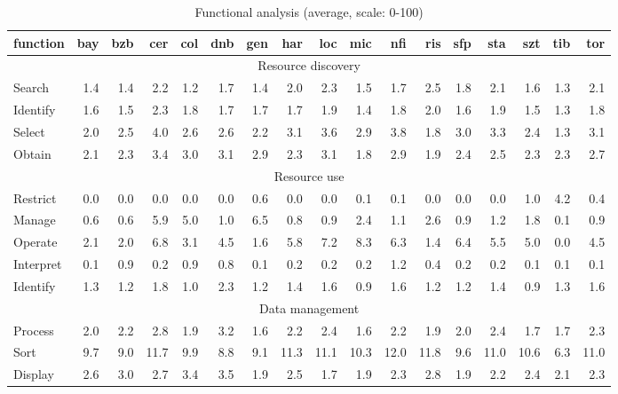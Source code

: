 \begin{table*}
\caption{Functional analysis (average, scale: 0-100)}
\label{tab:functional-analysis}
\begin{minipage}{17.5cm} %
\begin{center}
\begin{tabular}{lrrrrrrrrrrrrrrrr}
\toprule
function & bay & bzb & cer & col & dnb & gen & har & loc & mic & nfi & ris & sfp & sta & szt & tib & tor \\
\midrule
\multicolumn{17}{c}{Resource discovery} \\
Search & 1.4 & 1.4 & 2.2 & 1.2 & 1.7 & 1.4 & 2.0 & 2.3 & 1.5 & 1.7 & 2.5 & 1.8 & 2.1 & 1.6 & 1.3 & 2.1 \\
Identify & 1.6 & 1.5 & 2.3 & 1.8 & 1.7 & 1.7 & 1.7 & 1.9 & 1.4 & 1.8 & 2.0 & 1.6 & 1.9 & 1.5 & 1.3 & 1.8 \\
Select & 2.0 & 2.5 & 4.0 & 2.6 & 2.6 & 2.2 & 3.1 & 3.6 & 2.9 & 3.8 & 1.8 & 3.0 & 3.3 & 2.4 & 1.3 & 3.1 \\
Obtain & 2.1 & 2.3 & 3.4 & 3.0 & 3.1 & 2.9 & 2.3 & 3.1 & 1.8 & 2.9 & 1.9 & 2.4 & 2.5 & 2.3 & 2.3 & 2.7 \\
\multicolumn{17}{c}{Resource use} \\
Restrict & 0.0 & 0.0 & 0.0 & 0.0 & 0.0 & 0.6 & 0.0 & 0.0 & 0.1 & 0.1 & 0.0 & 0.0 & 0.0 & 1.0 & 4.2 & 0.4 \\
Manage & 0.6 & 0.6 & 5.9 & 5.0 & 1.0 & 6.5 & 0.8 & 0.9 & 2.4 & 1.1 & 2.6 & 0.9 & 1.2 & 1.8 & 0.1 & 0.9 \\
Operate & 2.1 & 2.0 & 6.8 & 3.1 & 4.5 & 1.6 & 5.8 & 7.2 & 8.3 & 6.3 & 1.4 & 6.4 & 5.5 & 5.0 & 0.0 & 4.5 \\
Interpret & 0.1 & 0.9 & 0.2 & 0.9 & 0.8 & 0.1 & 0.2 & 0.2 & 0.2 & 1.2 & 0.4 & 0.2 & 0.2 & 0.1 & 0.1 & 0.1 \\
Identify & 1.3 & 1.2 & 1.8 & 1.0 & 2.3 & 1.2 & 1.4 & 1.6 & 0.9 & 1.6 & 1.2 & 1.2 & 1.4 & 0.9 & 1.3 & 1.6 \\
\multicolumn{17}{c}{Data management} \\
Process & 2.0 & 2.2 & 2.8 & 1.9 & 3.2 & 1.6 & 2.2 & 2.4 & 1.6 & 2.2 & 1.9 & 2.0 & 2.4 & 1.7 & 1.7 & 2.3 \\
Sort & 9.7 & 9.0 & 11.7 & 9.9 & 8.8 & 9.1 & 11.3 & 11.1 & 10.3 & 12.0 & 11.8 & 9.6 & 11.0 & 10.6 & 6.3 & 11.0 \\
Display & 2.6 & 3.0 & 2.7 & 3.4 & 3.5 & 1.9 & 2.5 & 1.7 & 1.9 & 2.3 & 2.8 & 1.9 & 2.2 & 2.4 & 2.1 & 2.3 \\
\bottomrule
\end{tabular}
\end{center}
\end{minipage}
\end{table*}

